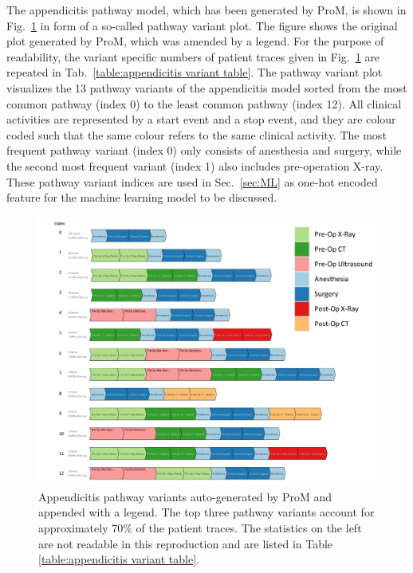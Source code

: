 The appendicitis pathway model, which has been generated by ProM, is shown in Fig.~\ref{fig:appendicitis pathway variants} in form of a so-called pathway variant plot.
The figure shows the original plot generated by ProM, which was amended by a legend.
For the purpose of readability, the variant specific numbers of patient traces given in  Fig.~\ref{fig:appendicitis pathway variants} are repeated in Tab.~\ref{table:appendicitis variant table}.
The pathway variant plot visualizes the 13 pathway variants of the appendicitis model sorted from the most common pathway (index 0) to the least common pathway (index 12). 
All clinical activities are represented by a start event and a stop event, and they are colour coded such that the same colour refers to the same clinical activity. The most frequent pathway variant (index 0) only consists of anesthesia and surgery, while the second most frequent variant (index 1) also includes pre-operation X-ray.
These pathway variant indices are used in Sec.~\ref{sec:ML} as one-hot encoded feature for the machine learning model to be discussed.

\begin{figure}[t]
\hspace{-2cm}
\includegraphics[width=1.5\textwidth]{images/appendicitis_variant_index_anes.jpg}
\caption{Appendicitis pathway variants auto-generated by ProM and appended with a legend. The top three pathway variants account for approximately 70\% of the patient traces. The statistics on the left are not readable in this reproduction and are listed in Table \ref{table:appendicitis variant table}.}
\label{fig:appendicitis pathway variants}
\end{figure}
\clearpage

